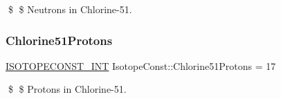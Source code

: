 \$ \$ Neutrons in Chlorine-\/51. \mbox{\label{group___isotope_const-_chlorine-_cl51_gaac00f585680af71742c8134117db0559}} 
\subsubsection{\texorpdfstring{Chlorine51\+Protons}{Chlorine51Protons}}
{\footnotesize\ttfamily \mbox{\hyperlink{group___isotope_const-_macros_ga5f18360b3e99483a35c32d789e62621c}{I\+S\+O\+T\+O\+P\+E\+C\+O\+N\+S\+T\+\_\+\+I\+NT}} Isotope\+Const\+::\+Chlorine51\+Protons = 17}

\$ \$ Protons in Chlorine-\/51. 